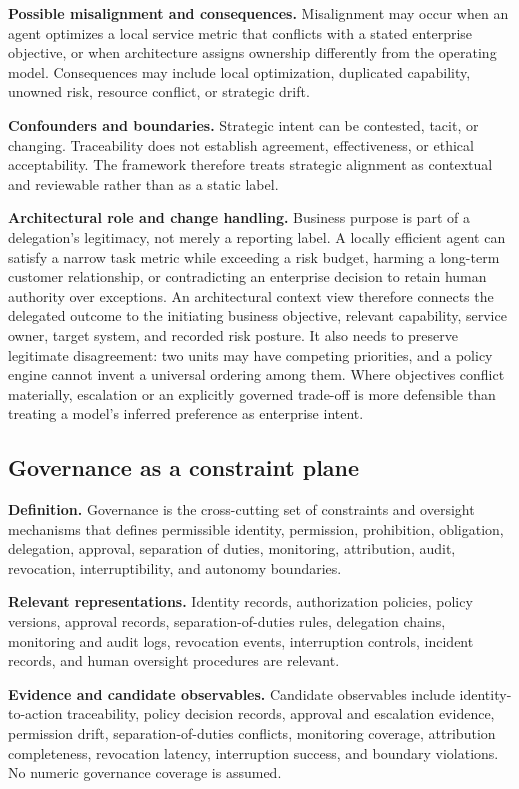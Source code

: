 \documentclass[11pt,letterpaper]{article}
\begin{document}
\textbf{Possible misalignment and consequences.} Misalignment may occur when an agent optimizes a local service metric that conflicts with a stated enterprise objective, or when architecture assigns ownership differently from the operating model. Consequences may include local optimization, duplicated capability, unowned risk, resource conflict, or strategic drift.

\textbf{Confounders and boundaries.} Strategic intent can be contested, tacit, or changing. Traceability does not establish agreement, effectiveness, or ethical acceptability. The framework therefore treats strategic alignment as contextual and reviewable rather than as a static label.

\textbf{Architectural role and change handling.} Business purpose is part of a delegation's legitimacy, not merely a reporting label. A locally efficient agent can satisfy a narrow task metric while exceeding a risk budget, harming a long-term customer relationship, or contradicting an enterprise decision to retain human authority over exceptions. An architectural context view therefore connects the delegated outcome to the initiating business objective, relevant capability, service owner, target system, and recorded risk posture. It also needs to preserve legitimate disagreement: two units may have competing priorities, and a policy engine cannot invent a universal ordering among them. Where objectives conflict materially, escalation or an explicitly governed trade-off is more defensible than treating a model's inferred preference as enterprise intent.

\subsection{Governance as a constraint plane}
\textbf{Definition.} Governance is the cross-cutting set of constraints and oversight mechanisms that defines permissible identity, permission, prohibition, obligation, delegation, approval, separation of duties, monitoring, attribution, audit, revocation, interruptibility, and autonomy boundaries.

\textbf{Relevant representations.} Identity records, authorization policies, policy versions, approval records, separation-of-duties rules, delegation chains, monitoring and audit logs, revocation events, interruption controls, incident records, and human oversight procedures are relevant.

\textbf{Evidence and candidate observables.} Candidate observables include identity-to-action traceability, policy decision records, approval and escalation evidence, permission drift, separation-of-duties conflicts, monitoring coverage, attribution completeness, revocation latency, interruption success, and boundary violations. No numeric governance coverage is assumed.
\end{document}
